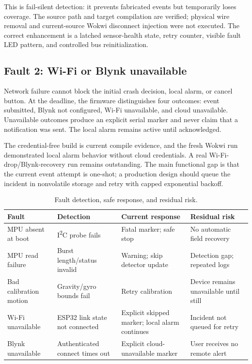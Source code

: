 \documentclass[12pt,a4paper]{article}
\begin{document}
This is fail-silent detection: it prevents fabricated events but temporarily
loses coverage. The source path and target compilation are verified; physical
wire removal and current-source Wokwi disconnect injection were not executed.
The correct enhancement is a latched sensor-health state, retry counter,
visible fault LED pattern, and controlled bus reinitialization.

\subsection{Fault 2: Wi-Fi or Blynk unavailable}

Network failure cannot block the initial crash decision, local alarm, or cancel
button. At the deadline, the firmware distinguishes four outcomes: event
submitted, Blynk not configured, Wi-Fi unavailable, and cloud unavailable.
Unavailable outcomes produce an explicit serial marker and never claim that a
notification was sent. The local alarm remains active until acknowledged.

The credential-free build is current compile evidence, and the fresh Wokwi
run demonstrated local alarm behavior without cloud credentials. A real
Wi-Fi-drop/Blynk-recovery run remains outstanding. The main functional gap is
that the current event attempt is one-shot; a production design should queue
the incident in nonvolatile storage and retry with capped exponential backoff.

\begin{table}[H]
\centering
\small
\caption{Fault detection, safe response, and residual risk.}
\begin{tabularx}{\textwidth}{@{}p{}p{}p{}X@{}}
\toprule
Fault & Detection & Current response & Residual risk \\
\midrule
MPU absent at boot & I\textsuperscript{2}C probe fails & Fatal marker; safe stop & No automatic field recovery \\
MPU read failure & Burst length/status invalid & Warning; skip detector update & Detection gap; repeated logs \\
Bad calibration motion & Gravity/gyro bounds fail & Retry calibration & Device remains unavailable until still \\
Wi-Fi unavailable & ESP32 link state not connected & Explicit skipped marker; local alarm continues & Incident not queued for retry \\
Blynk unavailable & Authenticated connect times out & Explicit cloud-unavailable marker & User receives no remote alert \\
\bottomrule
\end{tabularx}
\end{table}
\end{document}
